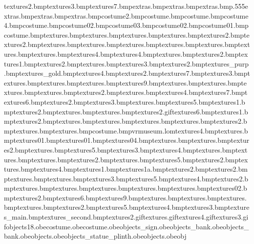 textures\banner2.bmp textures\banner3.bmp textures\signdirection7.bmp extras\polishertrailstar.bmp extras\polishertrail.bmp extras\map.bmp.555 extras\wantedlogomagenta.bmp extras\wbflag.bmp extras\wbstar.bmp costume\earslined2.bmp costume\noseshine.bmp costume\muzzlestubble.bmp costume\tongueline4.bmp costume\ninjaeyebrow.bmp costume\ninjamuzzle02.bmp costume\ninjakatana03.bmp costume\ninjakatana02.bmp costume\ninjakatana01.bmp costume\ninjaeyetex.bmp textures\doorarch.bmp textures\stairs.bmp textures\doorarchbot.bmp textures\doorarchpillar.bmp textures\pillardoor2.bmp textures\marbtiles2.bmp textures\lobbycarpet.bmp textures\marbtiles.bmp textures\lobbycarpetcol.bmp textures\lobbycarpetcorn.bmp textures\uplights.bmp textures\marbwall.bmp textures\lightbluewall.bmp textures\marbtiles4.bmp textures\bridgesnow4.bmp textures\roofpanels.bmp textures\sandbox2.bmp textures\sandbox1.bmp textures\marbwall2.bmp textures\lobbywallpinkstop.bmp textures\panels3.bmp textures\panels2.bmp textures_purp.bmp textures\floor_gold.bmp textures\wall4.bmp textures\wall2.bmp textures\wall7.bmp textures\wall3.bmp textures\marbwallbord.bmp textures\lobbywallpinkbord.bmp textures\lobbywallpinkbocorn.bmp textures\wall9.bmp textures\lobbywallpinkbotop.bmp textures\museummat.bmp textures\wallheat.bmp textures\panels.bmp textures\window2.bmp textures\pillardoor.bmp textures\lobbydesk4.bmp textures\lobbydesk7.bmp textures\lobbydesk6.bmp textures\lobbydesk2.bmp textures\lobbydesk3.bmp textures\lobbydesk.bmp textures\lobbydesk5.bmp textures\pillar1.bmp textures\pillar2.bmp textures\tv.bmp textures\tvback.bmp textures\tvsnow2.gif textures\signdirection6.bmp textures\signdirection1.bmp textures\plaquehotdog2.bmp textures\plaquehotdog.bmp textures\ceiling.bmp textures\sdoor.bmp textures\gramshine.bmp textures\noteboard2.bmp textures\noteboard.bmp textures\banner.bmp costume\ninjatoes.bmp vrmuseum.lom textures\banner4.bmp textures\bone.bmp textures\deptlight01.bmp textures\ctblue01.bmp textures\citypave04.bmp textures\paintingsamportrait.bmp textures\paintingcanvas.bmp textures\paintingcastle2.bmp textures\paintingcastle.bmp textures\paintingcastle5.bmp textures\paintingcastle3.bmp textures\paintingcastle4.bmp textures\chain.bmp textures\doorgroove.bmp textures\doorbig.bmp textures\hotdog2.bmp textures\compkey.bmp textures\compmont5.bmp textures\compmont2.bmp textures\compmont.bmp textures\compmont4.bmp textures\hotdog1.bmp textures\hotdog1a.bmp textures\tazwin2.bmp textures\frontdoor2.bmp textures\frontdoor.bmp textures\boot.bmp textures\boot3.bmp textures\boot5.bmp textures\boot4.bmp textures\boot2.bmp textures\tooth.bmp textures\spine.bmp textures\eye.bmp textures\nose.bmp textures\ribs.bmp textures\ribs02.bmp textures\signdirection2.bmp textures\companel6.bmp textures\companel9.bmp textures\torch.bmp textures\shipsteps.bmp textures\sdoorglass.bmp textures\cleaner.bmp textures\cleaner2.bmp textures\cleaner5.bmp textures\cleaner4.bmp textures\cleaner3.bmp textures\city_main.bmp textures\city_second.bmp textures\tvmuseum2.gif textures\tvmuseum.gif textures\tvmuseum4.gif textures\tvmuseum3.gif objects\box18.obe costume\ninjakatana.obe costume\tazninja.obe objects\exit_sign.obe objects\spark_bank.obe objects_bank.obe objects\checkpoints.obe objects\debris_statue_plinth.obe objects\sprites.obe obj